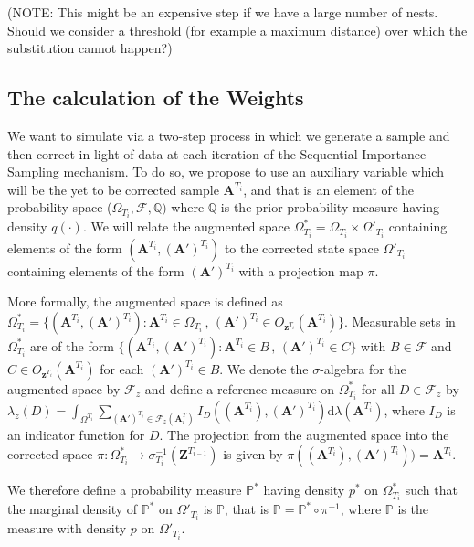 \documentclass[11pt,a4paper]{article}
\newcommand{\D}{\mathrm{d}}
\renewcommand{\vec}[1]{\mathbf{#1}}
\begin{document}
(NOTE: This might be an expensive step if we have a large number of nests. Should we consider a threshold (for example a maximum distance) over which the substitution cannot happen?)



\subsection{The calculation of the Weights} \label{subsec:weight}

We want to simulate via a two-step process in which we generate a sample and then correct in light of data at each iteration of the Sequential Importance Sampling mechanism. To do so, we propose to use an auxiliary variable which will be the yet to be corrected sample $\vec{A}^{T_i}$, and that is an element of the probability space ($\Omega_{T_i}, \mathcal{F}, \mathbb{Q})$ where $\mathbb{Q}$ is the prior probability measure having density $q(\cdot)$. We will relate the augmented space $\Omega^*_{T_i} = \Omega_{T_i} \times \Omega'_{T_i}$ containing elements of the form $(\vec{A}^{T_i}, (\vec{A}')^{T_i})$ to the corrected state space $\Omega'_{T_i}$ containing elements of the form  $(\vec{A}')^{T_i}$ with a projection map $\pi$. 

More formally, the augmented space is defined as $\Omega^*_{T_i} = \{ (\vec{A}^{T_i}, (\vec{A}')^{T_i}) : \vec{A}^{T_i} \in \Omega_{T_i} \, , \, (\vec{A}')^{T_i} \in O_{\vec{z}^{T_i}} (\vec{A}^{T_i}) \}$. Measurable sets in $\Omega^*_{T_i}$ are of the form $\{ (\vec{A}^{T_i}, (\vec{A}')^{T_i}) : \vec{A}^{T_i} \in B \, , \, (\vec{A}')^{T_i} \in C \}$ with $B \in \mathcal{F}$ and $C \in O_{\vec{z}^{T_i}} (\vec{A}^{T_i})$ for each $(\vec{A}')^{T_i} \in B$. We denote the $\sigma$-algebra for the augmented space by $\mathcal{F}_z$ and define a reference measure on $\Omega^*_{T_i}$ for all $D \in \mathcal{F}_z$ by $\lambda_z(D) = \int_{\Omega^{T_i}} \sum_{(\vec{A}')^{T_i} \in \mathcal{F}_z(\vec{A}^T_i)} I_D((\vec{A}^{T_i}), (\vec{A}')^{T_i}) \D \lambda(\vec{A}^{T_i})$, where $I_D$ is an indicator function for $D$. The projection from the augmented space into the corrected space $\pi : \Omega^*_{T_i} \rightarrow \sigma^{-1}_{T_i}(\vec{Z}^{T_{i-1}})$ is given by $\pi((\vec{A}^{T_i}), (\vec{A}')^{T_i})) = \vec{A}^{T_i}$. 

We therefore define a probability measure $\mathbb{P}^*$ having density $p^*$ on $\Omega^*_{T_i}$ such that the marginal density of $\mathbb{P}^*$ on $\Omega'_{T_i}$ is $\mathbb{P}$, that is $\mathbb{P} = \mathbb{P}^* \circ \pi^{-1}$, where $\mathbb{P}$ is the measure with density $p$ on $\Omega'_{T_i}$.
\end{document}
